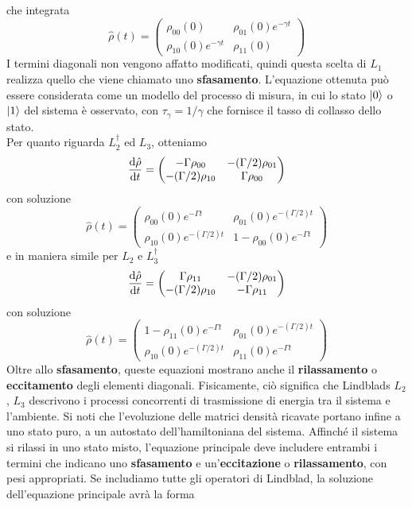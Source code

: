 \begin{esempio}
\begin{equation*}
\end{equation*}
che integrata
\begin{equation*}
    \hat \rho(t) = \begin{pmatrix}\rho_{00}(0) & \rho_{01}(0)e^{-\gamma t} \\ \rho_{10}(0)e^{-\gamma t} & \rho_{11}(0) \end{pmatrix}
\end{equation*}
I termini diagonali non vengono affatto modificati, quindi questa scelta di $L_1$ realizza quello che viene chiamato uno \textbf{sfasamento}. L'equazione ottenuta può essere considerata come un modello del processo di misura, in cui lo stato $\ket 0$ o $\ket 1$ del sistema è osservato, con $\tau_\gamma = 1/\gamma$ che fornisce il tasso di collasso dello stato.\\
Per quanto riguarda $L_2^\dagger$ ed $L_3$, otteniamo
\begin{equation*}
    \dv{\hat\rho}{t} = \begin{pmatrix}-\Gamma\rho_{00} & -(\Gamma/2)\rho_{01}\\-(\Gamma/2)\rho_{10} & \Gamma\rho_{00}\end{pmatrix}
\end{equation*}
con soluzione
\begin{equation*}
    \hat \rho(t) = \begin{pmatrix}\rho_{00}(0)e^{-\Gamma t} & \rho_{01}(0)e^{-(\Gamma/2)t} \\ \rho_{10}(0)e^{-(\Gamma/2) t} & 1-\rho_{00}(0)e^{-\Gamma t} \end{pmatrix}
\end{equation*}
e in maniera simile per $L_2$ e $L_3^\dagger$
\begin{equation*}
        \dv{\hat\rho}{t} = \begin{pmatrix} \Gamma\rho_{11} & -(\Gamma/2)\rho_{01}\\-(\Gamma/2)\rho_{10} & -\Gamma\rho_{11}\end{pmatrix}
\end{equation*}
con soluzione
\begin{equation*}
    \hat \rho(t) = \begin{pmatrix}1-\rho_{11}(0)e^{-\Gamma t} & \rho_{01}(0)e^{-(\Gamma/2)t} \\ \rho_{10}(0)e^{-(\Gamma/2) t} & \rho_{11}(0)e^{-\Gamma t} \end{pmatrix}
\end{equation*}
Oltre allo \textbf{sfasamento}, queste equazioni mostrano anche il \textbf{rilassamento} o \textbf{eccitamento} degli elementi diagonali. Fisicamente, ciò significa che Lindblads $L_2$, $L_3$ descrivono i processi concorrenti di trasmissione di energia tra il sistema e l'ambiente. Si noti che l'evoluzione delle matrici densità ricavate portano infine a uno stato puro, a un autostato dell'hamiltoniana del sistema. Affinché il sistema si rilassi in uno stato misto, l'equazione principale deve includere entrambi i termini che indicano uno \textbf{sfasamento} e un'\textbf{eccitazione} o \textbf{rilassamento}, con pesi appropriati. Se includiamo tutte gli operatori di Lindblad, la soluzione dell'equazione principale avrà la forma

\end{esempio}
